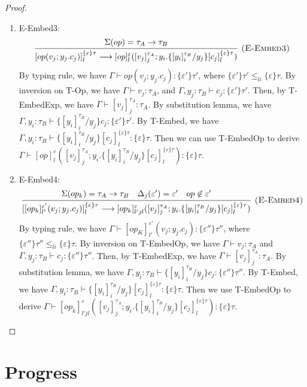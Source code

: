 \begin{proof}
\begin{enumerate}
\item E-Embed3: 
$$
\infer[\textsc{(E-Embed3)}]
{[op(v_j; y_j.c_j)]^{\{\varepsilon\}\tau}_l \longrightarrow [op]^\varepsilon_l([v_j]^{\tau_A}_j; y_i. \{[y_i]^{\tau_B}_i / y_j\}[c_j]^{\{\varepsilon\}\tau}_l)}
{ \Sigma(op) = \tau_A \rightarrow \tau_B} 
$$
By typing rule, we have $\Gamma \vdash op(v_j; y_j.c_j) : \{\varepsilon'\}\tau'$, where $\{\varepsilon'\}\tau' \leq_{li} \{\varepsilon\}\tau$. By inversion on T-Op, we have $\Gamma \vdash v_j : \tau_A$, and $\Gamma, y_j : \tau_B \vdash c_j: \{\varepsilon'\}\tau'$. Then, by T-EmbedExp, we have $\Gamma \vdash [v_j]^{\tau_A}_j : \tau_A$. By substitution lemma, we have $\Gamma, y_i: \tau_B \vdash \{[y_i]^{\tau_B}_i/y_j\}c_j : \{\varepsilon'\}\tau'$. By T-Embed, we have $\Gamma, y_i: \tau_B \vdash \{[y_i]^{\tau_B}_i/y_j\}[c_j]^{\{\varepsilon\}\tau}_l : \{\varepsilon\}\tau$. Then we can use T-EmbedOp to derive $\Gamma \vdash [op]^\varepsilon_l([v_j]^{\tau_A}_j; y_i. \{[y_i]^{\tau_B}_i / y_j\}[c_j]^{\{\varepsilon\}\tau}_l): \{\varepsilon\}\tau$. 

\item E-Embed4:
$$
\infer[\textsc{(E-Embed4)}]
{[[op_k]^{\varepsilon'}_{l'}(v_j; y_j.c_j)]^{\{\varepsilon\}\tau}_l \longrightarrow [op_k]^\varepsilon_{l'jl}([v_j]^{\tau_A}_j; y_i. \{[y_i]^{\tau_B}_i / y_j\}[c_j]^{\{\varepsilon\}\tau}_l)}
{ \Sigma(op_k) = \tau_A \rightarrow \tau_B& \Delta_j(\varepsilon') = \varepsilon' & op \not \in \varepsilon'} 
$$
By typing rule, we have $\Gamma \vdash [op_K]^{\varepsilon'}_{l'}(v_j; y_j.c_j) : \{\varepsilon''\}\tau''$, where $\{\varepsilon''\}\tau'' \leq_{li} \{\varepsilon\}\tau$. By inversion on T-EmbedOp, we have $\Gamma \vdash v_j: \tau_A$ and $\Gamma, y_j : \tau_B \vdash c_j: \{\varepsilon''\}\tau''$. Then, by T-EmbedExp, we have $\Gamma \vdash [v_j]^{\tau_A}_j : \tau_A$.
By substitution lemma, we have $\Gamma, y_i: \tau_B \vdash \{[y_i]^{\tau_B}_i/y_j\}c_j : \{\varepsilon''\}\tau''$. By T-Embed, we have $\Gamma, y_i: \tau_B \vdash \{[y_i]^{\tau_B}_i/y_j\}[c_j]^{\{\varepsilon\}\tau}_l : \{\varepsilon\}\tau$. Then we use T-EmbedOp to derive $\Gamma \vdash [op_k]^\varepsilon_{l'jl}([v_j]^{\tau_A}_j; y_i. \{[y_i]^{\tau_B}_i / y_j\}[c_j]^{\{\varepsilon\}\tau}_l) : \{\varepsilon\}\tau$.
\end{enumerate}
\end{proof}

\section{Progress}

